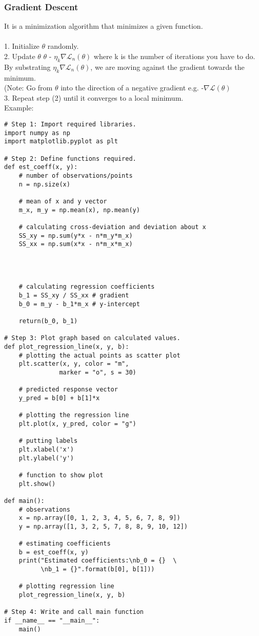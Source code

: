 \documentclass[a4paper]{article}
\begin{document}
\subsubsection{Gradient Descent}
It is a minimization algorithm that minimizes a given function. \\ \\
1. Initialize $\theta$ randomly. \\
2. Update $\theta$ \leftarrow  $\theta$ - $\eta_k \nabla \mathcal{L}_n (\theta)$ where k is the number of iterations you have to do. By substrating $\eta_k \nabla \mathcal{L}_n (\theta)$, we are moving against the gradient towards the minimum.\\
(Note: Go from $\theta$ into the direction of a negative gradient e.g. -$\nabla \mathcal{L}(\theta)$\\
3. Repeat step (2) until it converges to a local minimum.\\
Example:
\begin{verbatim}
# Step 1: Import required libraries.
import numpy as np 
import matplotlib.pyplot as plt 
  
# Step 2: Define functions required.
def est_coeff(x, y): 
    # number of observations/points 
    n = np.size(x) 
  
    # mean of x and y vector 
    m_x, m_y = np.mean(x), np.mean(y) 
  
    # calculating cross-deviation and deviation about x 
    SS_xy = np.sum(y*x - n*m_y*m_x) 
    SS_xx = np.sum(x*x - n*m_x*m_x) 




    # calculating regression coefficients 
    b_1 = SS_xy / SS_xx # gradient
    b_0 = m_y - b_1*m_x # y-intercept
  
    return(b_0, b_1) 
    
# Step 3: Plot graph based on calculated values.
def plot_regression_line(x, y, b): 
    # plotting the actual points as scatter plot 
    plt.scatter(x, y, color = "m", 
               marker = "o", s = 30) 
  
    # predicted response vector 
    y_pred = b[0] + b[1]*x 
  
    # plotting the regression line 
    plt.plot(x, y_pred, color = "g") 
  
    # putting labels 
    plt.xlabel('x') 
    plt.ylabel('y') 
  
    # function to show plot 
    plt.show() 
  
def main(): 
    # observations 
    x = np.array([0, 1, 2, 3, 4, 5, 6, 7, 8, 9]) 
    y = np.array([1, 3, 2, 5, 7, 8, 8, 9, 10, 12]) 
  
    # estimating coefficients 
    b = est_coeff(x, y) 
    print("Estimated coefficients:\nb_0 = {}  \ 
          \nb_1 = {}".format(b[0], b[1])) 
  
    # plotting regression line 
    plot_regression_line(x, y, b) 
 
# Step 4: Write and call main function 
if __name__ == "__main__": 
    main() \end{verbatim} 
\end{document}
